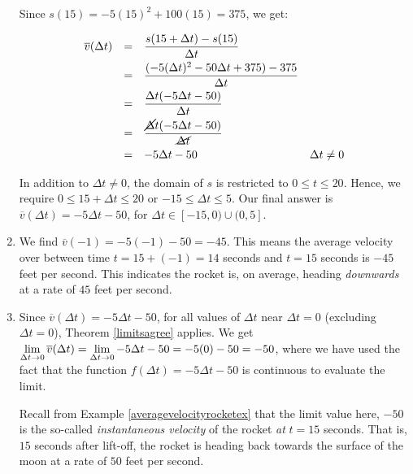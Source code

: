\documentclass{ximera}
\begin{document}
\begin{ex}
\begin{enumerate}
Since $s(15) = -5(15)^2 + 100(15) = 375$, we get:

\[ \begin{array}{rclr}

\overline{v}(\Delta t)& = & \dfrac{s(15+ \Delta t) - s(15)}{\Delta t} & \\ [7pt]
	                        & = & \dfrac{(-5(\Delta t)^2-50 \Delta t + 375) - 375}{\Delta t} & \\ [7pt]
	                        & = & \dfrac{\Delta t (-5 \Delta t - 50)}{\Delta t} & \\ [7pt]
	                         & = & \dfrac{\cancel{\Delta} t (-5 \Delta t - 50)}{\cancel{\Delta t}} & \\ [7pt]
	                         & = & -5 \Delta t - 50 & \text{$\Delta t \neq 0$} \\ \end{array} \]

In addition to $\Delta t \neq 0$,  the domain of $s$ is restricted to $0 \leq t \leq 20$.  Hence, we require  $0 \leq 15 + \Delta t \leq 20$ or  $-15 \leq \Delta t \leq 5$.  Our final answer is $\overline{v}(\Delta t) = -5 \Delta t - 50$, for $\Delta t \in [-15, 0) \cup (0, 5]$.



\item  We find  $\overline{v}(-1) = -5(-1) - 50 = -45$.  This means the average velocity over between time $t=15+(-1) = 14$ seconds and $t=15$ seconds is $-45$ feet per second.  This indicates the rocket is, on average, heading \textit{downwards} at a rate of $45$ feet per second.



\item  Since $\overline{v}(\Delta t) = -5 \Delta t - 50$, for all values of $\Delta t$ near $\Delta t = 0$ (excluding $\Delta t = 0$),  Theorem \ref{limitsagree} applies.  We get   $\ds{\lim_{\Delta t \rightarrow 0}  \overline{v}(\Delta t) = \lim_{\Delta t \rightarrow 0}  -5 \Delta t - 50 = -5(0) - 50 = -50}$, where we have used the fact that the function $f(\Delta t) = -5 \Delta t - 50$ is continuous to evaluate the limit.



Recall from Example \ref{averagevelocityrocketex} that the limit value here, $-50$  is the so-called \textit{instantaneous velocity} of the rocket \textit{at} $t=15$ seconds.  That is, $15$ seconds after lift-off, the rocket is heading back towards the surface of the moon at a rate of $50$ feet per second. 




\end{enumerate}
\end{ex}
\end{document}
